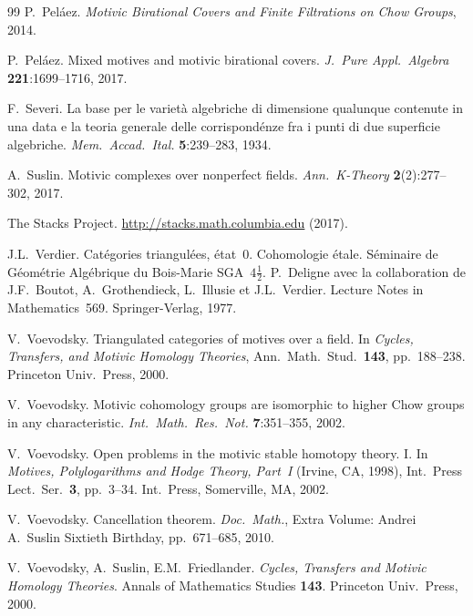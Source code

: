 \documentclass[12pt,a4paper]{article}
\theoremstyle{definition}
\begin{document}
\begin{thebibliography}{99}
P.\ Peláez. \textit{Motivic Birational Covers and Finite Filtrations on Chow
Groups}, 2014.

P.\ Peláez. Mixed motives and motivic birational covers.
\textit{J.\ Pure Appl.\ Algebra} \textbf{221}:1699--1716, 2017.

F.\ Severi. La base per le varietà algebriche di dimensione qualunque contenute in
una data e la teoria generale delle corrispondénze fra i punti di due superficie
algebriche. \textit{Mem.\ Accad.\ Ital.} \textbf{5}:239--283, 1934.

A.\ Suslin. Motivic complexes over nonperfect fields.
\textit{Ann.\ K-Theory} \textbf{2}(2):277--302, 2017.

The Stacks Project. \url{http://stacks.math.columbia.edu} (2017).

J.L.\ Verdier. Catégories triangulées, état~0. Cohomologie étale. Séminaire de
Géométrie Algébrique du Bois-Marie SGA~$4\tfrac{1}{2}$. P.\ Deligne avec la
collaboration de J.F.\ Boutot, A.\ Grothendieck, L.\ Illusie et J.L.\ Verdier.
Lecture Notes in Mathematics~569. Springer-Verlag, 1977.

V.\ Voevodsky. Triangulated categories of motives over a field. In
\textit{Cycles, Transfers, and Motivic Homology Theories}, Ann.\ Math.\ Stud.\
\textbf{143}, pp.\ 188--238. Princeton Univ.\ Press, 2000.

V.\ Voevodsky. Motivic cohomology groups are isomorphic to higher Chow groups in
any characteristic. \textit{Int.\ Math.\ Res.\ Not.} \textbf{7}:351--355, 2002.

V.\ Voevodsky. Open problems in the motivic stable homotopy theory. I.
In \textit{Motives, Polylogarithms and Hodge Theory, Part~I} (Irvine, CA, 1998),
Int.\ Press Lect.\ Ser.\ \textbf{3}, pp.\ 3--34. Int.\ Press, Somerville, MA, 2002.

V.\ Voevodsky. Cancellation theorem. \textit{Doc.\ Math.}, Extra Volume: Andrei A.\
Suslin Sixtieth Birthday, pp.\ 671--685, 2010.

V.\ Voevodsky, A.\ Suslin, E.M.\ Friedlander. \textit{Cycles, Transfers and
Motivic Homology Theories}. Annals of Mathematics Studies \textbf{143}.
Princeton Univ.\ Press, 2000.

\end{thebibliography}
\end{document}
